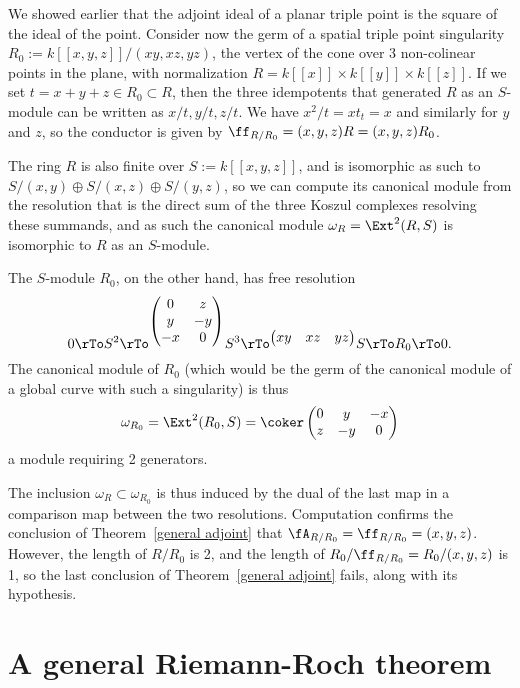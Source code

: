 \begin{example}\label{nongorenstein}
We showed earlier that the adjoint ideal of a planar triple point is the square of the ideal of the point. Consider now
  the germ of a spatial triple point singularity $R_0 := k[[x,y,z]]/(xy, xz,yz)$, the vertex of the cone over 3
 non-colinear points in the plane, with normalization $R = k[[x]]\times k[[y]]\times k[[z]]$.
 If we set $t = x+y+z\in R_0\subset R$, then the three idempotents that generated $R$ as an $S$-module
 can be written as $x/t, y/t, z/t$. We have $x^2/t = xt_t= x$ and similarly for $y$ and $z$, so
 the conductor is given by $\ff_{R/R_0} = (x,y,z)R = (x,y,z)R_0$.
 
 The ring $R$ is also finite over $S := k[[x,y,z]]$, and is isomorphic as such to 
 $S/(x,y)\oplus S/(x,z) \oplus S/(y,z)$, so we can compute its canonical module from the
 resolution that is the direct sum of the three Koszul complexes resolving these summands, and 
 as such the canonical module $\omega_R = \Ext^2(R,S)$ is isomorphic to $R$ as an $S$-module.
 

 The $S$-module $R_0$, on the other hand,   has free resolution
 $$
 0\rTo S^2\rTo^{
	\begin{pmatrix}
 0&z\\
 y&-y\\
 -x&0
\end{pmatrix}}
 S^3 \rTo^{
\begin{pmatrix}
 xy&xz&yz
\end{pmatrix}}
 S \rTo R_0 \rTo 0. 
 $$
The canonical module of $R_0$ (which would be the germ of the canonical module of a global curve with such a singularity) is thus 
 $$
 \omega_{R_0} = \Ext^2(R_0, S) = 
 \coker 
\begin{pmatrix}
 0&y&-x\\z&-y&0
\end{pmatrix}
$$
a module requiring 2 generators.
\end{example}
The inclusion $\omega_{R} \subset \omega_{R_0}$ is thus induced by the 
dual of the last map in a comparison map between the two resolutions. Computation
confirms the conclusion of Theorem~\ref{general adjoint} that $\fA_{R/R_0} = \ff_{R/R_0} = (x,y,z)$. However, the length of $R/R_0$ is 2, and the length of $R_0/\ff_{R/R_0} = R_0/(x,y,z)$ is  1, so the
last conclusion of Theorem~\ref{general adjoint} fails, along with its hypothesis.

\section{A general Riemann-Roch theorem}

